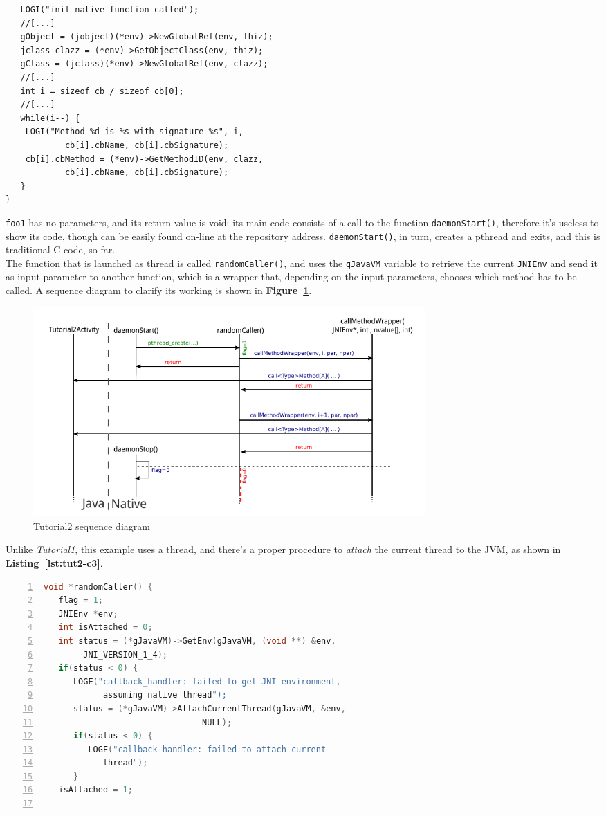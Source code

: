 \documentclass[a4paper,10pt]{article}
\newcommand{\keyword}[1]{\texttt{#1}}
\newcommand{\reff}[1]{\textbf{Figure~\ref{#1}}}
\newcommand{\refl}[1]{\textbf{Listing~\ref{#1}}}
\begin{document}
\begin{multicols}{2}
\begin{lstlisting}
   LOGI("init native function called");   
   //[...]   
   gObject = (jobject)(*env)->NewGlobalRef(env, thiz);
   jclass clazz = (*env)->GetObjectClass(env, thiz);
   gClass = (jclass)(*env)->NewGlobalRef(env, clazz);   
   //[...]   
   int i = sizeof cb / sizeof cb[0];
   //[...]   
   while(i--) {
   	LOGI("Method %d is %s with signature %s", i,
   			cb[i].cbName, cb[i].cbSignature);
   	cb[i].cbMethod = (*env)->GetMethodID(env, clazz,
   			cb[i].cbName, cb[i].cbSignature);
   }
}
\end{lstlisting}
\keyword{foo1} has no parameters, and its return value is void: its main code
consists of a call to the function \keyword{daemonStart()}, therefore it's
useless to show its code, though can be easily found on-line at the repository
address. \keyword{daemonStart()}, in turn, creates a pthread and exits, and this
is traditional C code, so far.\\
The function that is launched as thread is called \keyword{randomCaller()}, and
uses the \keyword{gJavaVM} variable to retrieve the current \keyword{JNIEnv} and
send it as input parameter to another function, which is a wrapper that,
depending on the input parameters, chooses which method has to be called. A
sequence diagram to clarify its working is shown in \reff{fig:tut12-seq}.
\begin{figure}[t]
\center
 \includegraphics[width=15cm]{./figures/sequence.pdf}
 \caption{Tutorial2 sequence diagram}
 \label{fig:tut12-seq}
\end{figure}
Unlike \textit{Tutorial1}, this example uses a thread, and there's a proper
procedure to \textit{attach} the current thread to the JVM, as shown in
\refl{lst:tut2-c3}.
\begin{lstlisting}[language=C,
		   columns=fullflexible,
		   showstringspaces=false,
		   xleftmargin=15pt,
		   frame = l,
		   numbers=left,
		   commentstyle=\color{gray}\upshape,
		   caption=tutorial2.c - thread attachment in  randomCaller(),
		   label=lst:tut2-c3]
void *randomCaller() {
   flag = 1;
   JNIEnv *env;
   int isAttached = 0;				   
   int status = (*gJavaVM)->GetEnv(gJavaVM, (void **) &env,
		JNI_VERSION_1_4);
   if(status < 0) {
      LOGE("callback_handler: failed to get JNI environment,
      		assuming native thread");
      status = (*gJavaVM)->AttachCurrentThread(gJavaVM, &env,
      							NULL);
      if(status < 0) {
         LOGE("callback_handler: failed to attach current
         	thread");
      }
   isAttached = 1;


\end{lstlisting}
\end{multicols}
\end{document}
